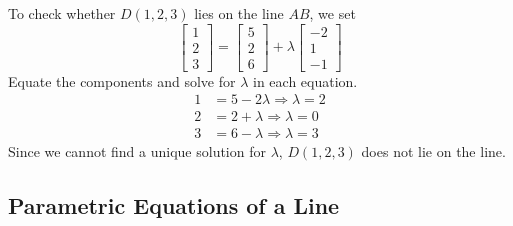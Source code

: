 \documentclass[11pt,a4paper]{book}
\begin{document}
\begin{example}
To check whether $D\left(1,2,3\right)$ lies on the line $AB$, we
set
\[
\begin{bmatrix}1\\
2\\
3
\end{bmatrix}=\begin{bmatrix}5\\
2\\
6
\end{bmatrix}+\lambda\begin{bmatrix}-2\\
1\\
-1
\end{bmatrix}
\]
Equate the components and solve for $\lambda$ in each equation.
\begin{align*}
1 & =5-2\lambda\Rightarrow\lambda=2\\
2 & =2+\lambda\Rightarrow\lambda=0\\
3 & =6-\lambda\Rightarrow\lambda=3
\end{align*}
Since we cannot find a unique solution for $\lambda$, $D\left(1,2,3\right)$
does not lie on the line.

\end{example}

\newpage

\subsection{Parametric Equations of a Line}
\end{document}
